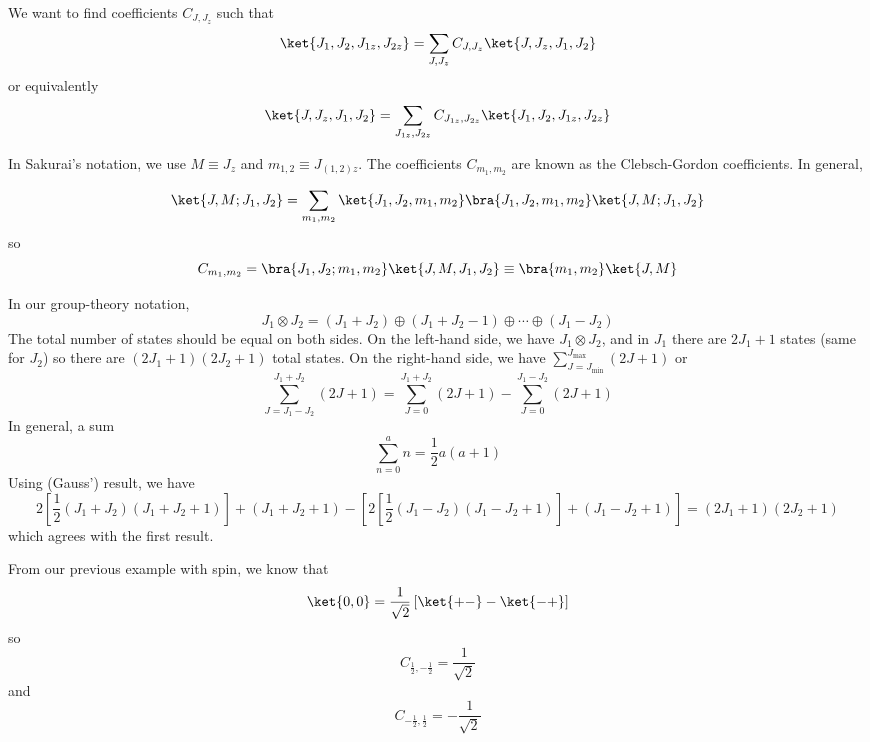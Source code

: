 \documentclass[a4paper,twoside,master.tex]{subfiles}
\begin{document}
We want to find coefficients $ C_{J,J_z} $ such that
\begin{equation}
    \ket{J_1, J_2, J_{1z}, J_{2z}} = \sum_{J, J_z} C_{J, J_z}\ket{J, J_z, J_1, J_2}
\end{equation}
or equivalently
\begin{equation}
    \ket{J, J_z, J_1, J_2} = \sum_{J_{1z}, J_{2z}} C_{J_{1z}, J_{2z}}\ket{J_1, J_2, J_{1z}, J_{2z}}
\end{equation}

In Sakurai's notation, we use $ M \equiv J_z $ and $ m_{1,2} \equiv J_{(1,2)z} $. The coefficients $ C_{m_1, m_2} $ are known as the Clebsch-Gordon coefficients. In general,

\begin{equation}
    \ket{J,M; J_1, J_2} = \sum_{m_1, m_2}\ket{J_1, J_2, m_1, m_2}\bra{J_1, J_2, m_1, m_2}\ket{J,M;J_1,J_2}
\end{equation}
so
\begin{equation}
    C_{m_1, m_2} =\bra{J_1, J_2; m_1, m_2}\ket{J,M,J_1, J_2} \equiv\bra{m_1, m_2}\ket{J,M}
\end{equation}

In our group-theory notation,
\begin{equation}
    J_1 \otimes J_2 = (J_1 + J_2) \oplus (J_1 + J_2 - 1) \oplus \cdots \oplus (J_1 - J_2)
\end{equation}
The total number of states should be equal on both sides. On the left-hand side, we have $ J_1 \otimes J_2 $, and in $ J_1 $ there are $ 2J_1 + 1 $ states (same for $ J_2 $) so there are $ (2J_1 + 1)(2 J_2 + 1) $ total states. On the right-hand side, we have $ \sum_{J=J_{\text{min}}}^{J_{\text{max}}} (2J+1) $ or
\begin{equation}
    \sum_{J=J_1 - J_2}^{J_1 + J_2} (2J+1) = \sum_{J=0}^{J_1 + J_2} (2J+1)- \sum_{J=0}^{J_1 - J_2} (2J + 1)
\end{equation}
In general, a sum
\begin{equation}
    \sum_{n=0}^{a} n = \frac{1}{2} a(a+1)
\end{equation}
Using (Gauss') result, we have
\begin{equation}
    2 \left[ \frac{1}{2} (J_1 + J_2)(J_1 + J_2 + 1) \right]+ (J_1 + J_2 + 1) - \left[ 2 \left[ \frac{1}{2}(J_1 - J_2)(J_1 - J_2 + 1) \right] + (J_1 - J_2 + 1)\right] = (2 J_1 + 1)(2 J_2 + 1)
\end{equation}
which agrees with the first result.

From our previous example with spin, we know that
\begin{equation}
    \ket{0,0} = \frac{1}{\sqrt{2}} \left[\ket{+-} -\ket{-+} \right]
\end{equation}
so
\begin{equation}
    C_{\frac{1}{2}, - \frac{1}{2}} = \frac{1}{\sqrt{2}}
\end{equation}
and
\begin{equation}
    C_{-\frac{1}{2}, \frac{1}{2}} = -\frac{1}{\sqrt{2}} 
\end{equation}
\end{document}
